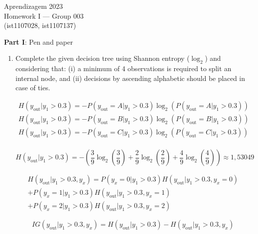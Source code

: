 \documentclass[12pt]{article}
\begin{document}
\begin{center}
Aprendizagem 2023\\
Homework I --- Group 003\\
(ist1107028, ist1107137)\vskip 1cm
\end{center}

\large{\textbf{Part I}: Pen and paper}\normalsize

\begin{enumerate}[leftmargin=\labelsep]
\item Complete the given decision tree using Shannon entropy ($\log_2$) and considering that:
    (i) a minimum of 4 observations is required to split an internal node, and (ii) decisions by ascending alphabetic should be placed in case of ties.

\begin{equation*}
    \begin{split}
        H(y_{\text{out}}|y_1 > 0.3) = - P(y_{\text{out}} = A|y_1 > 0.3)\log_2(P(y_{\text{out}} = A|y_1 > 0.3)) \\
        H(y_{\text{out}}|y_1 > 0.3) = - P(y_{\text{out}} = B|y_1 > 0.3)\log_2(P(y_{\text{out}} = B|y_1 > 0.3)) \\
        H(y_{\text{out}}|y_1 > 0.3) = - P(y_{\text{out}} = C|y_1 > 0.3)\log_2(P(y_{\text{out}} = C|y_1 > 0.3)) \\
    \end{split}
\end{equation*}

\begin{equation*}
    H(y_{\text{out}}|y_1 > 0.3) = - \left( \frac{3}{9} \log_2 \left( \frac{3}{9} \right) + \frac{2}{9} \log_2 \left( \frac{2}{9} \right) + \frac{4}{9} \log_2 \left( \frac{4}{9} \right) \right) \approx  1,53049
\end{equation*}

\begin{equation}
    \begin{split}
    H(y_{\text{out}} | y_1 > 0.3, y_x) = P(y_x = 0 | y_1 > 0.3) H(y_{\text{out}} | y_1 > 0.3, y_x = 0) \\
    + P(y_x = 1 | y_1 > 0.3) H(y_{\text{out}} | y_1 > 0.3, y_x = 1) \\
    + P(y_x = 2 | y_1 > 0.3) H(y_{\text{out}} | y_1 > 0.3, y_x = 2)
    \end{split}
\end{equation}

\begin{equation}
    IG(y_{\text{out}} | y_1 > 0.3, y_x) = H(y_{\text{out}} | y_1 > 0.3) - H(y_{\text{out}} | y_1 > 0.3, y_x)
\end{equation}


\end{enumerate}
\end{document}
